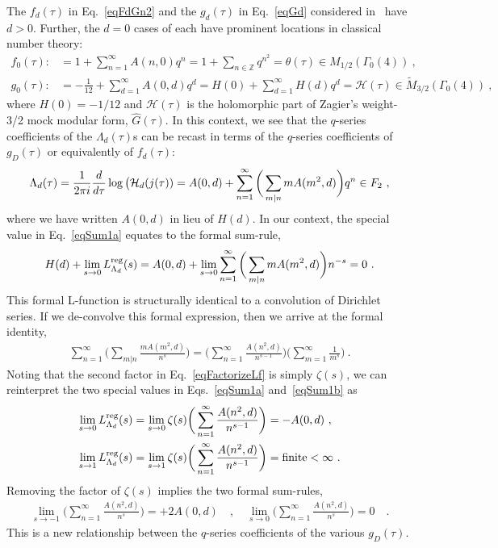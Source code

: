 \documentclass[11pt,a4paper]{article}
\newcommand{\G}{\Gamma}
\def\Z{\mathbb{Z}}
\newcommand{\reg}{{\rm reg}}
\begin{document}
The $f_d(\tau)$ in Eq.~\eqref{eqFdGn2} and the $g_d(\tau)$ in Eq.~\eqref{eqGd} considered in~\cite{02-TSM} have $d > 0$. Further, the $d = 0$ cases of each have prominent locations in classical number theory:
\begin{align}
f_0(\tau) :&= 1 + \sum_{n = 1}^{\infty} A(n,0) q^n =1 + \sum_{n \in \Z} q^{n^2} = \theta(\tau) \in M_{1/2}(\G_0(4))~, \label{eqF0} \\
g_0(\tau) :&= -\frac{1}{12} + \sum_{d = 1}^{\infty} A(0,d) q^d = H(0) + \sum_{d = 1}^{\infty} H(d) q^d = \mathscr{H}(\tau) \in \widetilde{M}_{3/2}(\G_0(4))~, \label{eqG0}
\end{align}
where $H(0) = -1/12$ and $\mathscr{H}(\tau)$ is the holomorphic part of Zagier's weight-3/2 mock modular form, $\hat{G}(\tau)$. In this context, we see that the $q$-series coefficients of the $\Lambda_d(\tau)$s can be recast in terms of the $q$-series coefficients of $g_D(\tau)$ or equivalently of $f_d(\tau)$:
\begin{align}
\Lambda_d(\tau) =  \frac{1}{2 \pi i}\frac{d}{d\tau}\log\big( {\cal H}_d(j(\tau)) = A(0,d) + \sum_{n = 1}^{\infty} \bigg( \sum_{m|n} m A(m^2,d) \bigg) q^n \in F_2 ~, \label{eqLambdaD3}
\end{align}
where we have written $A(0,d)$ in lieu of $H(d)$. In our context, the special value in Eq.~\eqref{eqSum1a} equates to the formal sum-rule,
\begin{align}
H(d) + \lim_{s \to 0} L_{\Lambda_d}^\reg(s) 
= A(0,d) + \lim_{s \to 0} \sum_{n = 1}^{\infty} \bigg( \sum_{m|n} m A(m^2,d)\bigg) n^{-s} 
= 0~. \label{eqFactorizeLf0}
\end{align}
This formal L-function is structurally identical to a convolution of Dirichlet series. If we de-convolve this formal expression, then we arrive at the formal identity,
\begin{align}
\sum_{n = 1}^{\infty} \bigg( \sum_{m|n} \frac{m A(m^2,d)}{n^{s}}\bigg) = 
\bigg(\sum_{n = 1}^{\infty} \frac{A(n^2,d)}{n^{s-1}} \bigg) \bigg( \sum_{m = 1}^{\infty} \frac{1}{m^s} \bigg)~. \label{eqFactorizeLf}
\end{align}
Noting that the second factor in Eq.~\eqref{eqFactorizeLf} is simply $\zeta(s)$, we can reinterpret the two special values in Eqs.~\eqref{eqSum1a} and~\eqref{eqSum1b} as
\begin{align}
\lim_{s \to 0} L_{\Lambda_d}^\reg(s) &= \lim_{s \to 0} \zeta(s) \bigg(\sum_{n = 1}^{\infty} \frac{A(n^2,d)}{n^{s-1}} \bigg) = -A(0,d)~, \label{eqSum2a} \\
\lim_{s \to 1} L_{\Lambda_d}^\reg(s) &= \lim_{s \to 1} \zeta(s) \bigg(\sum_{n = 1}^{\infty} \frac{A(n^2,d)}{n^{s-1}} \bigg) = {\rm finite} < \infty~. \label{eqSum2b}
\end{align}
Removing the factor of $\zeta(s)$ implies the two formal sum-rules,
\begin{align}
\lim_{s \to -1} \bigg(\sum_{n = 1}^{\infty} \frac{A(n^2,d)}{n^{s}} \bigg) = +2 A(0,d) \quad , \quad  
\lim_{s \to 0} \bigg(\sum_{n = 1}^{\infty} \frac{A(n^2,d)}{n^{s}} \bigg) = 0 \quad . \label{eqSumFull}
\end{align}
This is a new relationship between the $q$-series coefficients of the various $g_D(\tau)$. 
\end{document}
